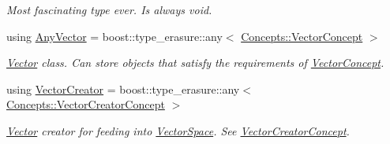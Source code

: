 \begin{DoxyCompactItemize}
\begin{DoxyCompactList}\small\item\em Most fascinating type ever. Is always void. \end{DoxyCompactList}\item 
using \hyperlink{group__SpacyGroup_gafc144d2730ef87a67e54f8cd750b1f54_gafc144d2730ef87a67e54f8cd750b1f54}{Any\+Vector} = boost\+::type\+\_\+erasure\+::any$<$ \hyperlink{group__ConceptGroup_gad6958389d1fa2758a8a64a0a24c36004_gad6958389d1fa2758a8a64a0a24c36004}{Concepts\+::\+Vector\+Concept} $>$
\begin{DoxyCompactList}\small\item\em \hyperlink{classSpacy_1_1Vector}{Vector} class. Can store objects that satisfy the requirements of \hyperlink{group__ConceptGroup_gad6958389d1fa2758a8a64a0a24c36004_VectorConceptAnchor}{Vector\+Concept}. \end{DoxyCompactList}\item 
using \hyperlink{group__SpacyGroup_ga1f5316487c031a478247206764bb2efb_ga1f5316487c031a478247206764bb2efb}{Vector\+Creator} = boost\+::type\+\_\+erasure\+::any$<$ \hyperlink{group__ConceptGroup_ga3064301642b7c66b1b08f88a12a04645_ga3064301642b7c66b1b08f88a12a04645}{Concepts\+::\+Vector\+Creator\+Concept} $>$
\begin{DoxyCompactList}\small\item\em \hyperlink{classSpacy_1_1Vector}{Vector} creator for feeding into \hyperlink{classSpacy_1_1VectorSpace}{Vector\+Space}. See \hyperlink{group__ConceptGroup_ga3064301642b7c66b1b08f88a12a04645_VectorCreatorConceptAnchor}{Vector\+Creator\+Concept}. \end{DoxyCompactList}\end{DoxyCompactItemize}
